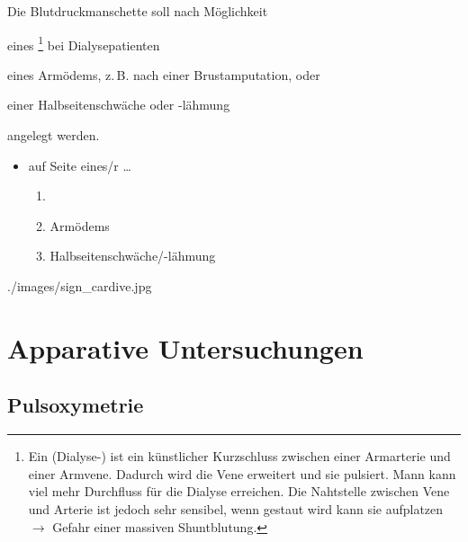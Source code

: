 {%
Die Blutdruckmanschette soll nach Möglichkeit 
\begin{inparaenum}
	\item eines \footnote{Ein (Dialyse-) ist ein
	künstlicher Kurzschluss zwischen einer Armarterie und einer Armvene. Dadurch wird
		die Vene erweitert und sie pulsiert. Mann kann viel mehr
		Durchfluss für die Dialyse erreichen. Die Nahtstelle
		zwischen Vene und Arterie ist jedoch sehr sensibel, wenn
		gestaut wird kann sie aufplatzen $\rightarrow$ Gefahr
		einer massiven Shuntblutung.} bei Dialysepatienten
		\item eines Armödems, z.\,B. nach einer
		Brustamputation, oder
		\item einer Halbseitenschwäche oder -lähmung 
\end{inparaenum} 
angelegt werden.

}{
\begin{itemize}
  \item {} auf Seite eines/r \dots{}
  \begin{enumerate}
    \item {}
    \item Armödems
    \item Halbseitenschwäche/-lähmung
  \end{enumerate}
\end{itemize}

}{./images/sign_cardive.jpg}{}{}










\section{Apparative Untersuchungen}

\subsection{Pulsoxymetrie}
\label{topic:pulsoxymetrie}




